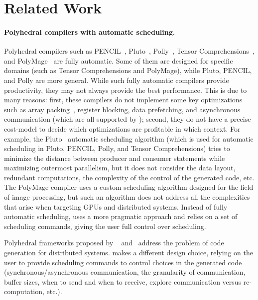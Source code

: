 \vspace{-0.25cm}
\section{Related Work\label{related}}

\paragraph{Polyhedral compilers with automatic scheduling.}

Polyhedral compilers such as PENCIL~\cite{pencil,pencil_paper}, Pluto~\cite{bondhugula_practical_2008}, Polly~\cite{polly}, Tensor Comprehensions~\cite{Vasilache2018TensorCF}, and PolyMage~\cite{Mullapudi:2015:PAO:2786763.2694364} are fully automatic.  Some of them are designed for specific domains (such as Tensor Comprehensions and PolyMage), while Pluto, PENCIL, and Polly are more general.
While such fully automatic compilers provide productivity, they may not always provide the best performance.  This is due to many reasons: first, these compilers do not implement some key optimizations such as array packing~\cite{Goto:2008:AHM:1356052.1356053}, register blocking, data prefetching, and asynchronous communication (which are all supported by \framework{}); second, they do not have a precise cost-model to decide which optimizations are profitable in which context.  For example, the Pluto~\cite{bondhugula_practical_2008} automatic scheduling algorithm (which is used for automatic scheduling in Pluto, PENCIL, Polly, and Tensor Comprehensions) tries to minimize the distance between producer and consumer statements while maximizing outermost parallelism, but it does not consider the data layout, redundant computations, the complexity of the control of the generated code, etc.  The PolyMage compiler uses a custom scheduling algorithm designed for the field of image processing, but such an algorithm does not address all the complexities that arise when targeting GPUs and distributed systems.
Instead of fully automatic scheduling, \framework uses a more pragmatic approach and relies on a set of scheduling commands, giving the user full control over scheduling.


Polyhedral frameworks proposed by ~\citet{Amarasinghe:1993:COC:173262.155102} and~\citet{6877466} address the problem of code generation for distributed systems. \framework{} makes a different design choice, relying on the user to provide scheduling commands to control choices in the generated code (synchronous/asynchronous communication, the granularity of communication, buffer sizes, when to send and when to receive, explore communication versus re-computation, etc.).

